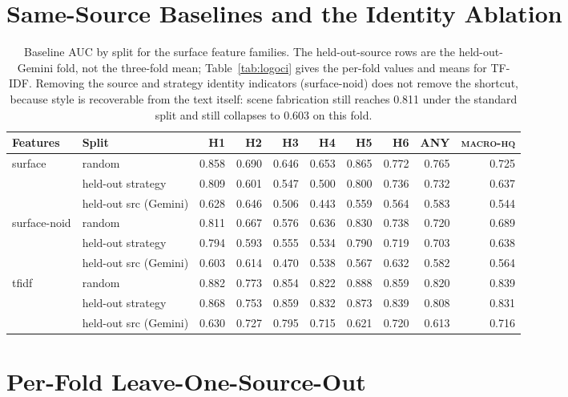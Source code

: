 \section{Same-Source Baselines and the Identity Ablation}
\label{app:baselines}

\begin{table}[H]
\caption{Baseline AUC by split for the surface feature families. The
held-out-source rows are the held-out-Gemini fold, not the three-fold mean;
Table~\ref{tab:logoci} gives the per-fold values and means for TF-IDF.
Removing the source and strategy identity indicators (surface-noid) does not
remove the shortcut, because style is recoverable from the text itself: scene
fabrication still reaches 0.811 under the standard split and still collapses to
0.603 on this fold.}
\label{tab:noid}
\centering\footnotesize
\setlength{\tabcolsep}{3pt}
\begin{tabular}{llrrrrrrrr}
\toprule
Features & Split & H1 & H2 & H3 & H4 & H5 & H6 & ANY & \textsc{macro-hq} \\
\midrule
\multirow{3}{*}{surface}
 & random            & 0.858 & 0.690 & 0.646 & 0.653 & 0.865 & 0.772 & 0.765 & 0.725 \\
 & held-out strategy & 0.809 & 0.601 & 0.547 & 0.500 & 0.800 & 0.736 & 0.732 & 0.637 \\
 & held-out src (Gemini) & 0.628 & 0.646 & 0.506 & 0.443 & 0.559 & 0.564 & 0.583 & 0.544 \\
\midrule
\multirow{3}{*}{surface-noid}
 & random            & 0.811 & 0.667 & 0.576 & 0.636 & 0.830 & 0.738 & 0.720 & 0.689 \\
 & held-out strategy & 0.794 & 0.593 & 0.555 & 0.534 & 0.790 & 0.719 & 0.703 & 0.638 \\
 & held-out src (Gemini) & 0.603 & 0.614 & 0.470 & 0.538 & 0.567 & 0.632 & 0.582 & 0.564 \\
\midrule
\multirow{3}{*}{tfidf}
 & random            & 0.882 & 0.773 & 0.854 & 0.822 & 0.888 & 0.859 & 0.820 & 0.839 \\
 & held-out strategy & 0.868 & 0.753 & 0.859 & 0.832 & 0.873 & 0.839 & 0.808 & 0.831 \\
 & held-out src (Gemini) & 0.630 & 0.727 & 0.795 & 0.715 & 0.621 & 0.720 & 0.613 & 0.716 \\
\bottomrule
\end{tabular}
\end{table}

\section{Per-Fold Leave-One-Source-Out}
\label{app:perfold}

